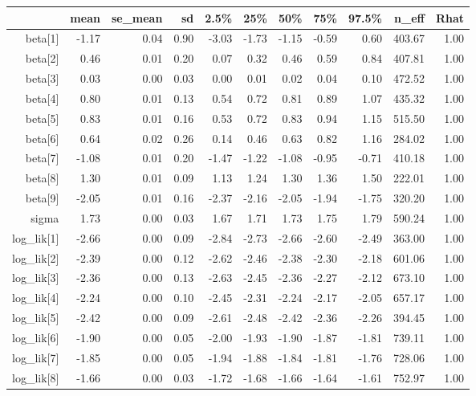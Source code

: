 \begin{table}[ht]
\centering
\begin{tabular}{rrrrrrrrrrr}
  \hline
 & mean & se\_mean & sd & 2.5\% & 25\% & 50\% & 75\% & 97.5\% & n\_eff & Rhat \\ 
  \hline
beta[1] & -1.17 & 0.04 & 0.90 & -3.03 & -1.73 & -1.15 & -0.59 & 0.60 & 403.67 & 1.00 \\ 
  beta[2] & 0.46 & 0.01 & 0.20 & 0.07 & 0.32 & 0.46 & 0.59 & 0.84 & 407.81 & 1.00 \\ 
  beta[3] & 0.03 & 0.00 & 0.03 & 0.00 & 0.01 & 0.02 & 0.04 & 0.10 & 472.52 & 1.00 \\ 
  beta[4] & 0.80 & 0.01 & 0.13 & 0.54 & 0.72 & 0.81 & 0.89 & 1.07 & 435.32 & 1.00 \\ 
  beta[5] & 0.83 & 0.01 & 0.16 & 0.53 & 0.72 & 0.83 & 0.94 & 1.15 & 515.50 & 1.00 \\ 
  beta[6] & 0.64 & 0.02 & 0.26 & 0.14 & 0.46 & 0.63 & 0.82 & 1.16 & 284.02 & 1.00 \\ 
  beta[7] & -1.08 & 0.01 & 0.20 & -1.47 & -1.22 & -1.08 & -0.95 & -0.71 & 410.18 & 1.00 \\ 
  beta[8] & 1.30 & 0.01 & 0.09 & 1.13 & 1.24 & 1.30 & 1.36 & 1.50 & 222.01 & 1.00 \\ 
  beta[9] & -2.05 & 0.01 & 0.16 & -2.37 & -2.16 & -2.05 & -1.94 & -1.75 & 320.20 & 1.00 \\ 
  sigma & 1.73 & 0.00 & 0.03 & 1.67 & 1.71 & 1.73 & 1.75 & 1.79 & 590.24 & 1.00 \\ 
  log\_lik[1] & -2.66 & 0.00 & 0.09 & -2.84 & -2.73 & -2.66 & -2.60 & -2.49 & 363.00 & 1.00 \\ 
  log\_lik[2] & -2.39 & 0.00 & 0.12 & -2.62 & -2.46 & -2.38 & -2.30 & -2.18 & 601.06 & 1.00 \\ 
  log\_lik[3] & -2.36 & 0.00 & 0.13 & -2.63 & -2.45 & -2.36 & -2.27 & -2.12 & 673.10 & 1.00 \\ 
  log\_lik[4] & -2.24 & 0.00 & 0.10 & -2.45 & -2.31 & -2.24 & -2.17 & -2.05 & 657.17 & 1.00 \\ 
  log\_lik[5] & -2.42 & 0.00 & 0.09 & -2.61 & -2.48 & -2.42 & -2.36 & -2.26 & 394.45 & 1.00 \\ 
  log\_lik[6] & -1.90 & 0.00 & 0.05 & -2.00 & -1.93 & -1.90 & -1.87 & -1.81 & 739.11 & 1.00 \\ 
  log\_lik[7] & -1.85 & 0.00 & 0.05 & -1.94 & -1.88 & -1.84 & -1.81 & -1.76 & 728.06 & 1.00 \\ 
  log\_lik[8] & -1.66 & 0.00 & 0.03 & -1.72 & -1.68 & -1.66 & -1.64 & -1.61 & 752.97 & 1.00 \\ 

\end{tabular}
\end{table}
